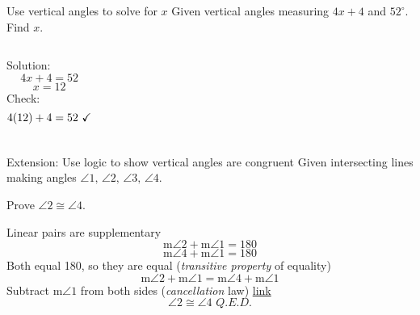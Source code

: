 \begin{frame}{Use vertical angles to solve for $x$}
  Given vertical angles measuring $4x+4$ and $52^\circ$. Find $x$. \par \vspace{1cm}
  \begin{columns}
      Solution:
        $$4x+4 = 52$$
        $$x=12$$
      Check:
        $$4(12)+4=52 \text{ \checkmark}$$
  \end{columns}
\end{frame}

\begin{frame}{Extension: Use logic to show vertical angles are congruent}
  Given intersecting lines making angles  
    $\angle 1 \text{, } \angle 2 \text{, } \angle 3 \text{, } \angle 4$. \par \medskip Prove $\angle 2 \cong \angle 4$.
  \begin{center}
  \end{center}
    Linear pairs are supplementary
      $$\text{m}\angle 2 + \text{m}\angle 1 = 180$$
      $$\text{m}\angle 4 + \text{m}\angle 1 = 180$$
    Both equal 180, so they are equal (\emph{transitive property} of equality)
      $$\text{m}\angle 2 + \text{m}\angle 1 = \text{m}\angle 4 + \text{m}\angle 1$$
    Subtract $\text{m}\angle 1$ from both sides (\emph{cancellation} law) \hfill \href{https://mathworld.wolfram.com/QED.html}{link}
      $$\angle 2 \cong \angle 4 \textit{ Q.E.D.}$$
\end{frame}

